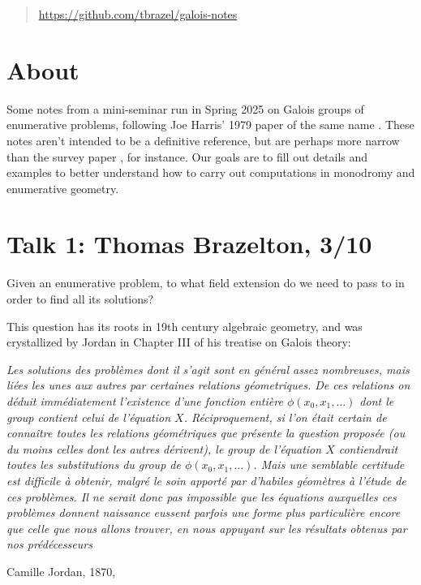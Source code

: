\documentclass[11pt]{amsart}
\newcommand{\quoteblock}[2]{\epigraph{\itshape#1}{#2}}
\begin{document}
\begin{abstract} \href{https://github.com/tbrazel/galois-notes}{https://github.com/tbrazel/galois-notes}
\end{abstract}

\maketitle



\setcounter{section}{-1}
\section{About}

Some notes from a mini-seminar run in Spring 2025 on Galois groups of enumerative problems, following Joe Harris' 1979 paper of the same name \cite{Harris-Galois}. These notes aren't intended to be a definitive reference, but are perhaps more narrow than the survey paper \cite{SottileYahl}, for instance. Our goals are to fill out details and examples to better understand how to carry out computations in monodromy and enumerative geometry.

\section{Talk 1: Thomas Brazelton, 3/10}

\begin{question} Given an enumerative problem, to what field extension do we need to pass to in order to find all its solutions?
\end{question}

This question has its roots in 19th century algebraic geometry, and was crystallized by Jordan in Chapter III of his treatise on Galois theory:


\quoteblock{%
Les solutions des problèmes dont il s'agit sont en général assez nombreuses, mais liées les unes aux autres par certaines relations géometriques. De ces relations on déduit immédiatement l'existence d'une fonction entière $\phi(x_0,x_1,\ldots)$ dont le group contient celui de l'équation $X$. Réciproquement, si l'on était certain de connaître \emph{toutes} les relations géométriques que présente la question proposée (ou du moins celles dont les autres dérivent), le group de l'équation $X$ contiendrait toutes les substitutions du group de $\phi(x_0,x_1,\ldots)$. Mais une semblable certitude est difficile à obtenir, malgré le soin apporté par d'habiles géomètres à l'étude de ces problèmes. Il ne serait donc pas impossible que les équations auxquelles ces problèmes donnent naissance eussent parfois une forme plus particulière encore que celle que nous allons trouver, en nous appuyant sur les résultats obtenus par nos prédécesseurs}{%
Camille Jordan, 1870, \cite[pp.301-302]{Jordan}}
\end{document}
